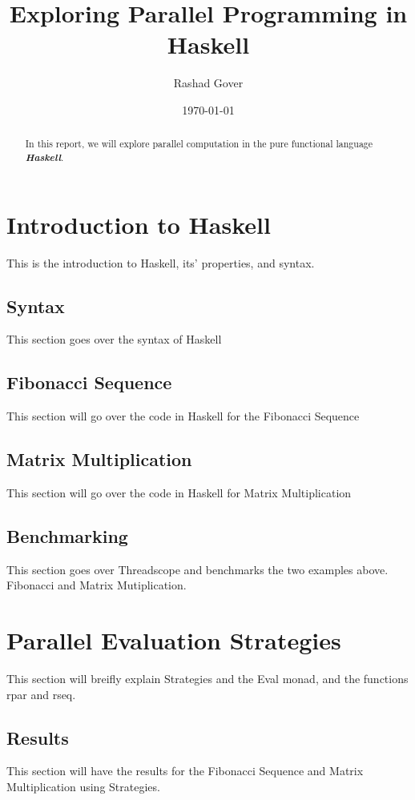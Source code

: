 \documentclass[a4paper, 12pt]{article}
\author{Rashad Gover}
\date{\today}
\title{Exploring Parallel Programming in Haskell}
\begin{document}
\maketitle

\newpage
\tableofcontents

\newpage

\begin{abstract}
  In this report, we will explore parallel computation in the pure functional language \textbf{\textit{Haskell}}.
\end{abstract}

\section{Introduction to Haskell}
This is the introduction to Haskell, its' properties, and syntax.

\subsection{Syntax}
This section goes over the syntax of Haskell

\subsection{Fibonacci Sequence}
This section will go over the code in Haskell for the Fibonacci Sequence

\subsection{Matrix Multiplication}
This section will go over the code in Haskell for Matrix Multiplication

\subsection{Benchmarking}
This section goes over Threadscope and benchmarks the two examples above. Fibonacci and Matrix Mutiplication.

\section{Parallel Evaluation Strategies}
This section will breifly explain Strategies and the Eval monad, and the functions rpar and rseq.

\subsection{Results}
This section will have the results for the Fibonacci Sequence and Matrix Multiplication using Strategies.
\end{document}
